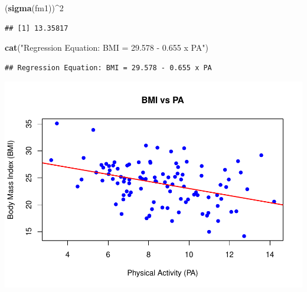\documentclass[
]{article}
\newenvironment{Shaded}{\begin{snugshade}}{\end{snugshade}}
\newcommand{\AttributeTok}[1]{\textcolor[rgb]{0.13,0.29,0.53}{#1}}
\newcommand{\DecValTok}[1]{\textcolor[rgb]{0.00,0.00,0.81}{#1}}
\newcommand{\FunctionTok}[1]{\textcolor[rgb]{0.13,0.29,0.53}{\textbf{#1}}}
\newcommand{\NormalTok}[1]{#1}
\newcommand{\SpecialCharTok}[1]{\textcolor[rgb]{0.81,0.36,0.00}{\textbf{#1}}}
\newcommand{\StringTok}[1]{\textcolor[rgb]{0.31,0.60,0.02}{#1}}
\begin{document}
\begin{Shaded}
\begin{Highlighting}[]
\NormalTok{(}\FunctionTok{sigma}\NormalTok{(fm1))}\SpecialCharTok{\^{}}\DecValTok{2}
\end{Highlighting}
\end{Shaded}

\begin{verbatim}
## [1] 13.35817
\end{verbatim}

\begin{Shaded}
\begin{Highlighting}[]
\FunctionTok{cat}\NormalTok{(}\StringTok{"Regression Equation: BMI = 29.578 {-} 0.655 x PA"}\NormalTok{)}
\end{Highlighting}
\end{Shaded}

\begin{verbatim}
## Regression Equation: BMI = 29.578 - 0.655 x PA
\end{verbatim}

\begin{Shaded}
\end{Shaded}

\includegraphics{MA_331_Final_-_Amane_and_Harry--2-_files/figure-latex/unnamed-chunk-3-1.pdf}
\end{document}
